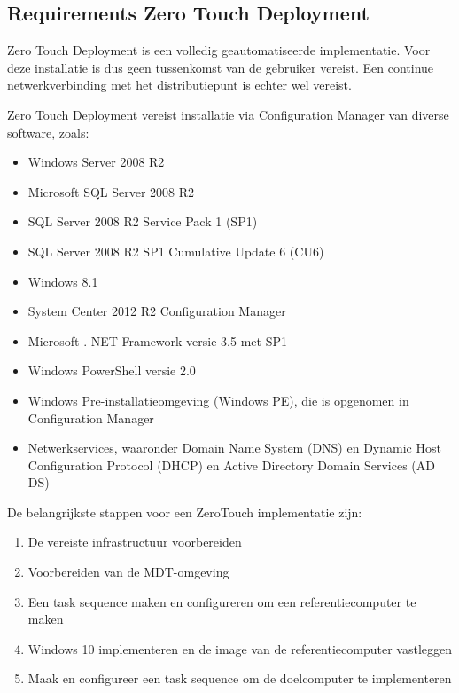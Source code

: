 \subsection{Requirements Zero Touch Deployment}
Zero Touch Deployment is een volledig geautomatiseerde implementatie. Voor deze installatie is dus geen tussenkomst van de gebruiker vereist.
Een continue netwerkverbinding met het distributiepunt is echter wel vereist.

Zero Touch Deployment vereist installatie via Configuration Manager van diverse software, zoals:

\begin{itemize}
    \item Windows Server 2008 R2
    \item Microsoft SQL Server 2008 R2
    \item SQL Server 2008 R2 Service Pack 1 (SP1)
    \item SQL Server 2008 R2 SP1 Cumulative Update 6 (CU6)
    \item Windows 8.1
    \item System Center 2012 R2 Configuration Manager
    \item Microsoft . NET Framework versie 3.5 met SP1
    \item Windows PowerShell versie 2.0
    \item Windows Pre-installatieomgeving (Windows PE), die is opgenomen in Configuration Manager
    \item Netwerkservices, waaronder Domain Name System (DNS) en Dynamic Host Configuration Protocol (DHCP) en Active Directory Domain Services (AD DS)
\end{itemize}

De belangrijkste stappen voor een ZeroTouch implementatie zijn:

\begin{enumerate}
    \item De vereiste infrastructuur voorbereiden
    \item Voorbereiden van de MDT-omgeving
    \item Een task sequence maken en configureren om een referentiecomputer te maken
    \item Windows 10 implementeren en de image van de referentiecomputer vastleggen
    \item Maak en configureer een task sequence om de doelcomputer te implementeren
\end{enumerate}



